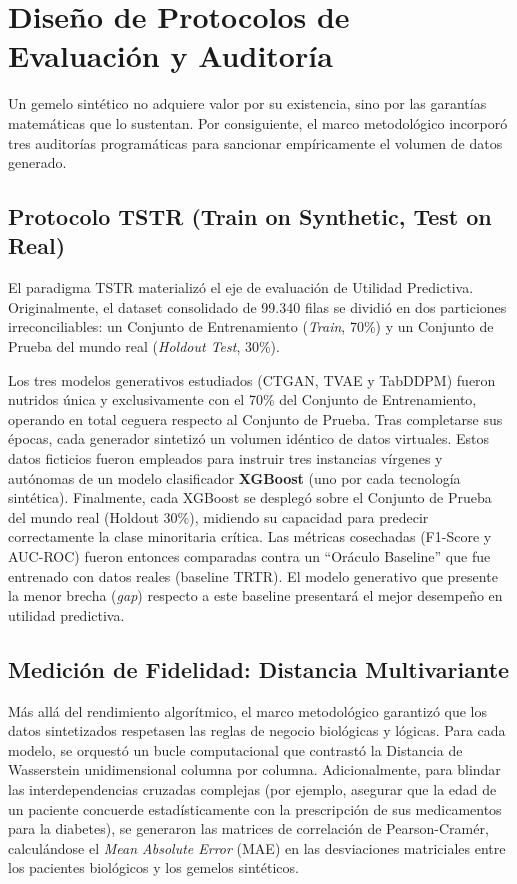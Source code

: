 \section{Diseño de Protocolos de Evaluación y Auditoría}

Un gemelo sintético no adquiere valor por su existencia, sino por las garantías matemáticas que lo sustentan. Por consiguiente, el marco metodológico incorporó tres auditorías programáticas para sancionar empíricamente el volumen de datos generado.

\subsection{Protocolo TSTR (Train on Synthetic, Test on Real)}

El paradigma TSTR materializó el eje de evaluación de Utilidad Predictiva. Originalmente, el dataset consolidado de 99.340 filas se dividió en dos particiones irreconciliables: un Conjunto de Entrenamiento (\textit{Train}, 70\%) y un Conjunto de Prueba del mundo real (\textit{Holdout Test}, 30\%).

Los tres modelos generativos estudiados (CTGAN, TVAE y TabDDPM) fueron nutridos única y exclusivamente con el 70\% del Conjunto de Entrenamiento, operando en total ceguera respecto al Conjunto de Prueba. Tras completarse sus épocas, cada generador sintetizó un volumen idéntico de datos virtuales. Estos datos ficticios fueron empleados para instruir tres instancias vírgenes y autónomas de un modelo clasificador \textbf{XGBoost} (uno por cada tecnología sintética). Finalmente, cada XGBoost se desplegó sobre el Conjunto de Prueba del mundo real (Holdout 30\%), midiendo su capacidad para predecir correctamente la clase minoritaria crítica. Las métricas cosechadas (F1-Score y AUC-ROC) fueron entonces comparadas contra un ``Oráculo Baseline'' que fue entrenado con datos reales (baseline TRTR). El modelo generativo que presente la menor brecha (\textit{gap}) respecto a este baseline presentará el mejor desempeño en utilidad predictiva.

\subsection{Medición de Fidelidad: Distancia Multivariante}

Más allá del rendimiento algorítmico, el marco metodológico garantizó que los datos sintetizados respetasen las reglas de negocio biológicas y lógicas. Para cada modelo, se orquestó un bucle computacional que contrastó la Distancia de Wasserstein unidimensional columna por columna. Adicionalmente, para blindar las interdependencias cruzadas complejas (por ejemplo, asegurar que la edad de un paciente concuerde estadísticamente con la prescripción de sus medicamentos para la diabetes), se generaron las matrices de correlación de Pearson-Cramér, calculándose el \textit{Mean Absolute Error} (MAE) en las desviaciones matriciales entre los pacientes biológicos y los gemelos sintéticos.

